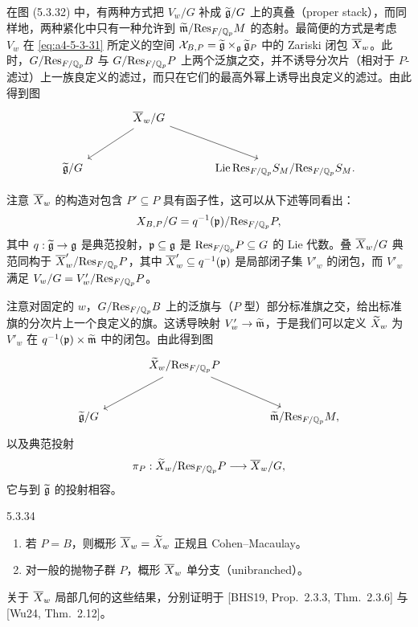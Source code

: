 在图 (5.3.32) 中，有两种方式把 $V_w/G$ 补成 $\widetilde{\mathfrak{g}}/G$ 上的真叠（proper stack），而同样地，两种紧化中只有一种允许到 $\widetilde{\mathfrak{m}}/\mathrm{Res}_{F/\mathbb{Q}_p}M$ 的态射。最简便的方式是考虑 $V_w$ 在 \eqref{eq:a4-5-3-31} 所定义的空间 $\mathcal{X}_{B,P}=\widetilde{\mathfrak{g}}\times_{\mathfrak{g}}\widetilde{\mathfrak{g}}_P$ 中的 Zariski 闭包 $\overline X_w$。此时，$G/\mathrm{Res}_{F/\mathbb{Q}_p}B$ 与 $G/\mathrm{Res}_{F/\mathbb{Q}_p}P$ 上两个泛旗之交，并不诱导分次片（相对于 $P$-滤过）上一族良定义的滤过，而只在它们的最高外幂上诱导出良定义的滤过。由此得到图
\[
\begin{tikzcd}[row sep=large,column sep=large]
 & \ol X_w/G\arrow[dl]\arrow[dr] & \\
 \wt{\frakg}/G & & \mathrm{Lie}\,\mathrm{Res}_{F/\Q_p}S_M/\mathrm{Res}_{F/\Q_p}S_M.
\end{tikzcd}
\]

注意 $\overline X_w$ 的构造对包含 $P'\subseteq P$ 具有函子性，这可以从下述等同看出：
\[
X_{B,P}/G=q^{-1}(\mathfrak{p})/\mathrm{Res}_{F/\mathbb{Q}_p}P,
\]
其中 $q:\widetilde{\mathfrak{g}}\to\mathfrak{g}$ 是典范投射，$\mathfrak{p}\subseteq\mathfrak{g}$ 是 $\mathrm{Res}_{F/\mathbb{Q}_p}P\subseteq G$ 的 Lie 代数。叠 $\overline X_w/G$ 典范同构于 $\overline X'_w/\mathrm{Res}_{F/\mathbb{Q}_p}P$，其中 $\overline X'_w\subseteq q^{-1}(\mathfrak{p})$ 是局部闭子集 $V'_w$ 的闭包，而 $V'_w$ 满足 $V_w/G=V'_w/\mathrm{Res}_{F/\mathbb{Q}_p}P$。

注意对固定的 $w$，$G/\mathrm{Res}_{F/\mathbb{Q}_p}B$ 上的泛旗与（$P$ 型）部分标准旗之交，给出标准旗的分次片上一个良定义的旗。这诱导映射 $V'_w\to\widetilde{\mathfrak{m}}$，于是我们可以定义 $\widetilde X_w$ 为 $V'_w$ 在 $q^{-1}(\mathfrak{p})\times\widetilde{\mathfrak{m}}$ 中的闭包。由此得到图
\[
\begin{tikzcd}[row sep=large,column sep=large]
 & \wt X_w/\mathrm{Res}_{F/\Q_p}P\arrow[dl]\arrow[dr] & \\
 \wt{\frakg}/G & & \wt{\frakm}/\mathrm{Res}_{F/\Q_p}M,
\end{tikzcd}
\]
以及典范投射
\[
\pi_P:\widetilde X_w/\mathrm{Res}_{F/\mathbb{Q}_p}P\longrightarrow\overline X_w/G,
\]
它与到 $\widetilde{\mathfrak{g}}$ 的投射相容。

\begin{prop}{5.3.34}\label{thm:a4-5-3-34}
\begin{enumerate}[label=(\roman*),leftmargin=2.2em,itemsep=0.1em]
\item 若 $P=B$，则概形 $\overline X_w=\widetilde X_w$ 正规且 Cohen--Macaulay。
\item 对一般的抛物子群 $P$，概形 $\overline X_w$ 单分支（unibranched）。
\end{enumerate}
\end{prop}

关于 $\overline X_w$ 局部几何的这些结果，分别证明于 [BHS19, Prop.\ 2.3.3, Thm.\ 2.3.6] 与 [Wu24, Thm.\ 2.12]。

